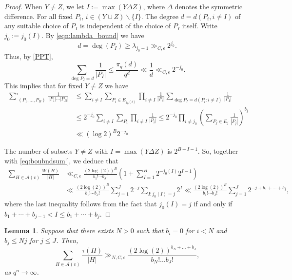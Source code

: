 \documentclass[12pt]{amsart}
\numberwithin{equation}{section}
\newtheorem{lemma}[theorem]{Lemma}
\theoremstyle{definition}
\theoremstyle{remark}
\begin{document}
\begin{proof}
    When $Y \neq Z$, we let $I := \max (Y \Delta Z)$, where $\Delta$ denotes the symmetric difference. For all fixed $P_i$, $i \in (Y\cup Z)\smallsetminus\{ I\}$. The degree $d = d(P_i, i\neq I)$ of any suitable choice of $P_I$ is independent of the choice of $P_I$ itself. 
    Write $j_0:= j_0(I)$. By \eqref{eqn:lambda_bound} we have 
    \[
        d = \deg (P_I) \geq \lambda_{j_0-1} \gg_{C,\epsilon} 2^{j_0}.
    \]
    Thus, by \eqref{PPT},
    \begin{equation}
        \sum_{\deg P_I=d} \frac{1}{|P_I|} \leq \frac{\pi_q(d)}{q^{d}} \ll \frac{1}{d} \ll_{C,\epsilon} 2^{-j_0}.
    \end{equation}
    This implies that for fixed $Y \neq Z$ we have
    \begin{equation}\label{eq:boubndsum'}
    \begin{split}
        \mathop{{\sum}'}_{(P_1,\dotsc,P_B)}\frac{1}{|P_1| \dotsb |P_B|}  &\leq
        \sum_{i\neq I} \sum_{P_i\in E_{j_0(i)}} \prod_{i\neq I}\frac{1}{|P_i|} \sum_{\deg P_I=d(P_i:i\neq I)} \frac{1}{|P_I|}\\
        &\leq 2^{-j_0} \sum_{i\neq I} \sum_{P_i} \prod_{i\neq I}\frac{1}{|P_i|} \leq 2^{-j_0} \prod_{i\neq j_0} \left( \sum_{P_j \in E_j} \frac{1}{|P_j|} \right)^{b_j} \\
        &\ll (\log 2)^B 2^{-j_0}
    \end{split}
    \end{equation}
        
    The number of subsets $Y\neq Z$ with $I=\max(Y\Delta Z)$ is $2^{B+I-1}$. 
    So, together with \eqref{eq:boubndsum'}, we deduce that 
    \begin{align*}
        \sum_{H \in \mathcal{A}(v)} \frac{W(H)}{|H|} &\ll_{C,\epsilon} \frac{(2\log(2))^B}{b_1 ! \dotsb b_J !} \left(1 + \sum_{I=1}^B 2^{-j_0(I)} 2^{I-1}\right) \\
        &\ll \frac{(2\log(2))^B}{b_1 ! \dotsb b_J !} \sum_{j=1}^J 2^{-j} \sum_{I: j_0(I) = j} 2^I 
        \ll \frac{(2\log(2))^B}{b_1 ! \dotsb b_J !} \sum_{j=1}^J 2^{-j+b_1+\dotsb +b_j},
    \end{align*}
    where the last inequality follows from the fact that $j_0(I)=j$ if and only if $b_1+\dotsb+b_{j-1} < I \leq b_1+ \dotsb + b_j$.
    
\end{proof}

\begin{lemma}\label{lm:tau(A)}
    Suppose that there exists $N>0$ such that $b_i=0$ for $i<N$ and $b_j \leq Nj$ for $j\leq J$. Then,
    \[
        \sum_{H\in\mathcal{A}(v)} \frac{\tau (H)}{|H|} \gg_{N,C,\epsilon} \frac{(2 \log(2))^{b_N+\dots+b_J}}{b_N!\dots b_J!},
    \]
as $q^n \to \infty$.
\end{lemma}
\end{document}
